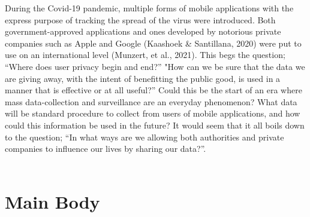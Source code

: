 \documentclass[11pt]{article}
\begin{document}
During the Covid-19 pandemic, multiple forms of mobile applications with the express purpose of tracking the spread of the virus were introduced. Both government-approved applications and ones developed by notorious private companies such as Apple and Google (Kaashoek \& Santillana, 2020) were put to use on an international level (Munzert, et al., 2021). This begs the question; “Where does user privacy begin and end?” "How can we be sure that the data we are giving away, with the intent of benefitting the public good, is used in a manner that is effective or at all useful?” Could this be the start of an era where mass data-collection and surveillance are an everyday phenomenon? What data will be standard procedure to collect from users of mobile applications, and how could this information be used in the future? It would seem that it all boils down to the question; “In what ways are we allowing both authorities and private companies to influence our lives by sharing our data?”. 
\\ \\
\section{Main Body}
\end{document}

